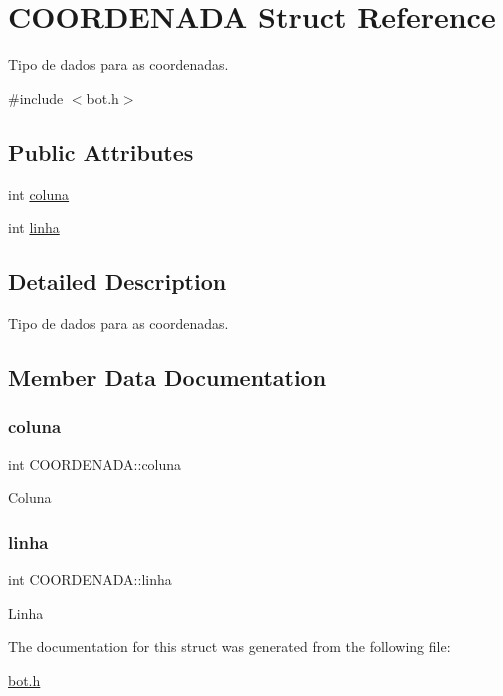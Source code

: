 \hypertarget{structCOORDENADA}{}\section{C\+O\+O\+R\+D\+E\+N\+A\+DA Struct Reference}
\label{structCOORDENADA}


Tipo de dados para as coordenadas.  




{\ttfamily \#include $<$bot.\+h$>$}

\subsection*{Public Attributes}
\begin{DoxyCompactItemize}
\item 
int \hyperlink{structCOORDENADA_adfbc8d4856ce807139fdf62e00aed29a}{coluna}
\item 
int \hyperlink{structCOORDENADA_aefe14bcc5a066ac3b21500cc3d28c06f}{linha}
\end{DoxyCompactItemize}


\subsection{Detailed Description}
Tipo de dados para as coordenadas. 

\subsection{Member Data Documentation}
\mbox{\label{structCOORDENADA_adfbc8d4856ce807139fdf62e00aed29a}} 
\subsubsection{\texorpdfstring{coluna}{coluna}}
{\footnotesize\ttfamily int C\+O\+O\+R\+D\+E\+N\+A\+D\+A\+::coluna}

Coluna \mbox{\label{structCOORDENADA_aefe14bcc5a066ac3b21500cc3d28c06f}} 
\subsubsection{\texorpdfstring{linha}{linha}}
{\footnotesize\ttfamily int C\+O\+O\+R\+D\+E\+N\+A\+D\+A\+::linha}

Linha 

The documentation for this struct was generated from the following file\+:\begin{DoxyCompactItemize}
\item 
\hyperlink{bot_8h}{bot.\+h}\end{DoxyCompactItemize}
